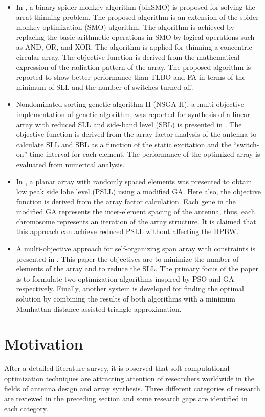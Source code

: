 \begin{itemize}
\item In \cite{arrayThin2}, a binary spider monkey algorithm (binSMO) is proposed for solving the arrat thinning problem. The proposed algorithm is an extension of the spider monkey optimization (SMO) algorithm. The algorithm is achieved by replacing the basic arithmetic operations in SMO by logical operations such as AND, OR, and XOR. The algorithm is applied for thinning a concentric circular array. The objective function is derived from the mathematical expression of the radiation pattern of the array. The proposed algorithm is reported to show better performance than TLBO and FA in terms of the minimum of SLL and the number of switches turned off.
\item Nondominated sorting genetic algorithm II (NSGA-II), a multi-objective implementation of genetic algorithm, was reported for synthesis of a linear array with reduced SLL and side-band level (SBL) is presented in \cite{arraySynth2}. The objective function is derived from the array factor analysis of the antenna to calculate SLL and SBL as a function of the static excitation and the ``switch-on'' time interval for each element. The performance of the optimized array is evaluated from numerical analysis.
\item In \cite{randomlySpacedArray}, a planar array with randomly spaced elements was presented to obtain low peak side lobe level (PSLL) using a modified GA. Here also, the objective function is derived from the array factor calculation. Each gene in the modified GA represents the inter-element spacing of the antenna, thus, each chromosome represents an iteration of the array structure. It is claimed that this approach can achieve reduced PSLL without affecting the HPBW.
\item A multi-objective approach for self-organizing span array with constraints is presented in \cite{selfOrgOpt}. This paper the objectives are to minimize the number of elements of the array and to reduce the SLL. The primary focus of the paper is to formulate two optimization algorithms inspired by PSO and GA respectively. Finally, another system is developed for finding the optimal solution by combining the results of both algorithms with a minimum Manhattan distance assisted triangle-approximation.
\end{itemize}

\section{Motivation} \label{sec_motiv}
After a detailed literature survey, it is observed that soft-computational optimization techniques are attracting attention of researchers worldwide in the fields of antenna design and array synthesis. Three different categories of research are reviewed in the preceding section and some research gaps are identified in each category.


